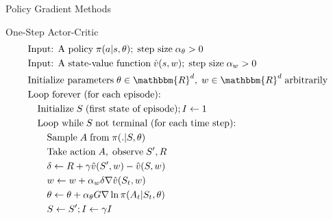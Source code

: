 \documentclass[ignorenonframetext,xcolor=x11names]{beamer}
\begin{document}
\begin{frame}{Policy Gradient Methods}
\small
\begin{block}{One-Step Actor-Critic}
\vspace{-.5\baselineskip}
\begin{align*}
& \text{Input: A policy}\;\pi(a | s, \theta);\;\text{step size}\; \alpha_\theta > 0 \\
& \text{Input: A state-value function}\;\hat{v}(s, w);\;\text{step size}\; \alpha_w > 0 \\
& \text{Initialize parameters}\; \theta \in \mathbbm{R}^d,\; w \in \mathbbm{R}^d\;\text{arbitrarily} \\
& \text{Loop forever (for each episode):} \\
& \quad \text{Initialize}\;S\;\text{(first state of episode)}; I \leftarrow 1 \\
& \quad \text{Loop while}\;S\;\text{not terminal (for each time step):} \\
& \quad \quad \text{Sample}\;A\;\text{from}\; \pi(.|S, \theta) \\
& \quad \quad \text{Take action}\;A,\;\text{observe}\;S', R \\
& \quad \quad \delta \leftarrow R + \gamma \hat{v}(S', w) - \hat{v}(S, w) \\
& \quad \quad w \leftarrow w + \alpha_w \delta \nabla \hat{v}(S_t, w) \\
& \quad \quad \theta \leftarrow \theta + \alpha_\theta G \nabla \ln \pi(A_t | S_t, \theta) \\
& \quad \quad S \leftarrow S'; I \leftarrow \gamma I
\end{align*}
\vspace{-\baselineskip}
\end{block}
\end{frame}
\end{document}
